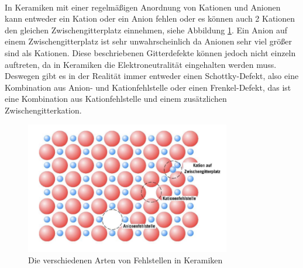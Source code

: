 \documentclass[11pt,a4paper]{article}
\numberwithin{equation}{section}
\numberwithin{figure}{section}
\begin{document}
\\
\begin{addmargin}[25pt]{0pt}
In Keramiken mit einer regelmäßigen Anordnung von Kationen und Anionen kann entweder ein Kation oder ein Anion fehlen oder es können auch 2 Kationen den gleichen Zwischengitterplatz einnehmen, siehe Abbildung \ref{fig:Fehlstellen_Keramiken}. Ein Anion auf einem Zwischengitterplatz ist sehr unwahrscheinlich da Anionen sehr viel größer sind als Kationen. Diese beschriebenen Gitterdefekte können jedoch nicht einzeln auftreten, da in Keramiken die Elektroneutralität eingehalten werden muss. Deswegen gibt es in der Realität immer entweder einen Schottky-Defekt, also eine Kombination aus Anion- und Kationfehlstelle oder einen Frenkel-Defekt, das ist eine Kombination aus Kationfehlstelle und einem zusätzlichen Zwischengitterkation.\\
\begin{figure}[h]
    \centering
    \includegraphics[width = 0.8\textwidth]{images/Materialwissenschaften/Fehlstellen_Keramiken.jpeg}
    \caption{Die verschiedenen Arten von Fehlstellen in Keramiken}
    \label{fig:Fehlstellen_Keramiken}
\end{figure}
\end{addmargin}
\end{document}
